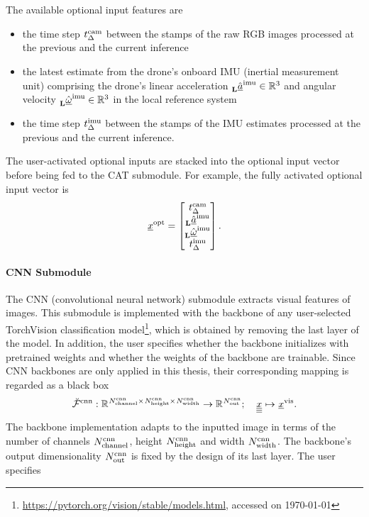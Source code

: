 The available optional input features are
\begin{itemize}
    \item the time step
    $\rawRGBTimeStep$
    between the stamps of the raw RGB images processed
    at the previous and the current inference
    \item the latest estimate from the drone's onboard IMU
    (inertial measurement unit) 
    comprising the drone's linear acceleration
    $\IMULinAcc \in \R{3}$
    and angular velocity
    $\IMUAngVel \in \R{3}$
    in the local reference system
    \item the time step
    $\IMUTimeStep$
    between the stamps of the IMU estimates
    processed at the previous and the current inference.
\end{itemize}
The user-activated optional inputs are stacked into the optional input vector
before being fed to the CAT submodule.
For example, the fully activated optional input vector is
\begin{align} \label{eq:opt_inp_vec}
    \optFeatVec{} =
    \begin{bmatrix}
        \rawRGBTimeStep \\
        \IMULinAcc \\
        \IMUAngVel \\
        \IMUTimeStep
    \end{bmatrix}.
\end{align}








\paragraph*{CNN Submodule} ${}$\\
The CNN (convolutional neural network) submodule 
extracts visual features of images.
This submodule is implemented with the backbone
of any user-selected TorchVision
classification model\footnote{
    \url{https://pytorch.org/vision/stable/models.html}, accessed on \today
},
which is obtained by removing the last layer of the model.
In addition, the user specifies whether the backbone
initializes with pretrained weights and whether
the weights of the backbone are trainable.
Since CNN backbones are only applied in this thesis, 
their corresponding mapping is 
regarded as a black box 
\begin{align} \label{eq:CNN}
    \CNNMap 
    :
    \R{\CNNNumC \times \CNNHeight \times \CNNWidth} 
    \rightarrow 
    \R{\CNNOutp}
    ;\quad 
    \img[]{}{}{}{}
    \mapsto 
    \visFeatVec{}
    .
\end{align}
The backbone implementation adapts to the inputted image
in terms of 
the number of channels $\CNNNumC$,
height $\CNNHeight$
and width $\CNNWidth$.
The backbone's output dimensionality 
$\CNNOutp$
is fixed by the design of its last layer.
The user specifies


